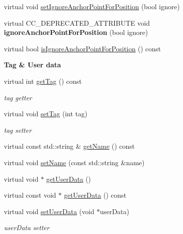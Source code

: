\begin{Indent}
\begin{DoxyCompactItemize}
\item 
virtual void \hyperlink{classNode_a0bedb5e314188f86e32fd986c449b28b}{set\+Ignore\+Anchor\+Point\+For\+Position} (bool ignore)
\item 
\mbox{\label{classNode_af57b28e27b22e7473e902771db3581e4}} 
virtual C\+C\+\_\+\+D\+E\+P\+R\+E\+C\+A\+T\+E\+D\+\_\+\+A\+T\+T\+R\+I\+B\+U\+TE void {\bfseries ignore\+Anchor\+Point\+For\+Position} (bool ignore)
\item 
virtual bool \hyperlink{classNode_a083fb03ef1904b0b0d4bc12c40a23f5c}{is\+Ignore\+Anchor\+Point\+For\+Position} () const
\end{DoxyCompactItemize}
\end{Indent}
\begin{Indent}\textbf{ Tag \& User data}\par
\begin{DoxyCompactItemize}
\item 
virtual int \hyperlink{classNode_a9f18b6db8146f2660e8761bb9557d1fe}{get\+Tag} () const
\begin{DoxyCompactList}\small\item\em tag getter \end{DoxyCompactList}\item 
virtual void \hyperlink{classNode_a41ecfc5e9e398e70dfe2e158f926c16f}{set\+Tag} (int tag)
\begin{DoxyCompactList}\small\item\em tag setter \end{DoxyCompactList}\item 
virtual const std\+::string \& \hyperlink{classNode_a2ddaa1e6fdada0bec680128d9e732162}{get\+Name} () const
\item 
virtual void \hyperlink{classNode_a519730c66b26e65c6539a908e6905edc}{set\+Name} (const std\+::string \&name)
\item 
virtual void $\ast$ \hyperlink{classNode_afeacb9cc8c8730d3ee8359ef42d5318d}{get\+User\+Data} ()
\item 
virtual const void $\ast$ \hyperlink{classNode_a8f7eb64c4811677bc4ea83562981caf6}{get\+User\+Data} () const
\item 
virtual void \hyperlink{classNode_ad07f1d7702df679c5d07772bcfd316a2}{set\+User\+Data} (void $\ast$user\+Data)
\begin{DoxyCompactList}\small\item\em user\+Data setter \end{DoxyCompactList}\item 

\end{DoxyCompactItemize}
\end{Indent}
